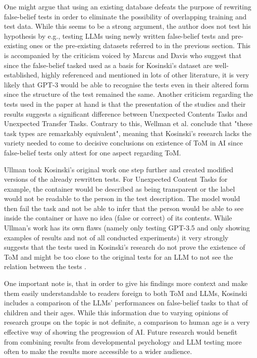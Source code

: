 One might argue that using an existing database defeats the purpose of rewriting false-belief tests in order to eliminate the possibility of overlapping training and test data. While this seems to be a strong argument, the author does not test his hypothesis by e.g., testing LLMs using newly written false-belief tests and pre-existing ones or the pre-existing datasets referred to in the previous section. This is accompanied by the criticism voiced by Marcus and Davis \cite{critics2} who suggest that since the false-belief tasked used as a basis for Kosinski's dataset are well-established, highly referenced and mentioned in lots of other literature, it is very likely that GPT-3 would be able to recognise the tests even in their altered form since the structure of the test remained the same. Another criticism regarding the tests used in the paper at hand is that the presentation of the studies and their results suggests a significant difference between Unexpected Contents Tasks and Unexpected Transfer Tasks. Contrary to this, Wellman et al. conclude that "these task types are remarkably equivalent"\cite{tom_children_2001}, meaning that Kosinski's research lacks the variety needed to come to decisive conclusions on existence of ToM in AI since false-belief tests only attest for one aspect regarding ToM.

Ullman took Kosinski's original work one step further and created modified versions of the already rewritten tests. For Unexpected Content Tasks for example, the container would be described as being transparent or the label would not be readable to the person in the test description. The model would then fail the task and not be able to infer that the person would be able to see inside the container or have no idea (false or correct) of its contents. While Ullman's work has its own flaws (namely only testing GPT-3.5 and only showing examples of results and not of all conducted experiments) it very strongly suggests that the tests used in Kosinski's research do not prove the existence of ToM and might be too close to the original tests for an LLM to not see the relation between the tests \cite{critics3}.

One important note is, that in order to give his findings more context and make them easily understandable to readers foreign to both ToM and LLMs, Kosinski includes a comparison of the LLMs' performances on false-belief tasks to that of children and their ages. While this information due to varying opinions of research groups on the topic is not definite, a comparison to human age is a very effective way of showing the progression of AI. Future research would benefit from combining results from developmental psychology and LLM testing more often to make the results more accessible to a wider audience.


